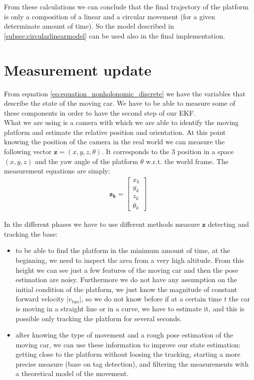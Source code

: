 From these calculations we can conclude that the final trajectory of the platform is only a composition of a linear and a circular movement (for a given determinate amount of time). So the model described in \ref{subsec:circularlinearmodel} can be used also in the final implementation.

\section{Measurement update}
From equation \ref{eq:equation_nonholonomic_discrete} we have the variables that describe the state of the moving car. We have to be able to measure some of these components in order to have the second step of our EKF. \\
What we are using is a camera with which we are able to identify the moving platform and estimate the relative position and orientation. At this point knowing the position of the camera in the real world we can measure the following vector $\boldsymbol{z} = (x, y, z,\theta)$. It corresponds to the 3 position in a space $(x,y,z)$ and the yaw angle of the platform $\theta$ w.r.t. the world frame.
The measurement equations are simply:
\begin{align}
\boldsymbol{z_k} = 
\begin{bmatrix}
x_k  \\[10pt]
y_k  \\[10pt]
z_k \\[10pt]
\theta_k
\end{bmatrix}
\label{eq:realmeasure}
\end{align}

In the different phases we have to use different methods measure  $\boldsymbol{z}$ detecting and tracking the base:
\begin{itemize}
\item to be able to find the platform in the minimum amount of time, at the beginning, we need to inspect the area from a very high altitude. From this height we can see just a few features of the moving car and then the pose estimation are noisy. Furthermore we do not have any assumption on the initial condition of the platform, we just know the magnitude of constant forward velocity $|v_{tan}|$, so we do not know before if at a certain time $t$ the car is moving in a straight line or in a curve, we have to estimate it, and this is possible only tracking the platform for several seconds. 
\item after knowing the type of movement and a rough pose estimation of the moving car, we can use these information to improve our state estimation: getting close to the platform without loosing the tracking, starting a more precise measure (base on tag detection), and filtering the measurements with a theoretical model of the movement.
\end{itemize}
